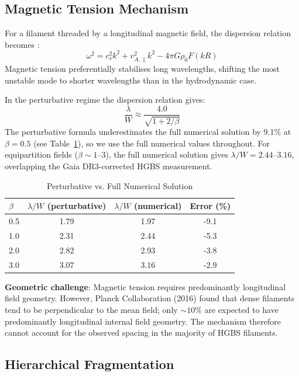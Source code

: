 \documentclass[twoside,twocolumn]{mnras}
\begin{document}
\subsection{Magnetic Tension Mechanism}

For a filament threaded by a longitudinal magnetic field, the dispersion relation
becomes \citep{Nakamura1993}:
\begin{equation}
\omega^2 = c_s^2 k^2 + v_{A,\parallel}^2 k^2 - 4\pi G\rho_0 F(kR)
\label{eq:dispersion}
\end{equation}
Magnetic tension preferentially stabilises long wavelengths, shifting the most unstable
mode to shorter wavelengths than in the hydrodynamic case.

In the perturbative regime the dispersion relation gives:
\begin{equation}
\frac{\lambda}{W} \approx \frac{4.0}{\sqrt{1 + 2/\beta}}
\label{eq:tension}
\end{equation}
The perturbative formula underestimates the full numerical solution by 9.1\% at $\beta=0.5$
(see Table~\ref{tab:perturbative}), so we use the full numerical values throughout.
For equipartition fields ($\beta \sim 1$--$3$), the full numerical solution gives
$\lambda/W = 2.44$--$3.16$, overlapping the Gaia DR3-corrected HGBS measurement.

\begin{table}
\caption{Perturbative vs. Full Numerical Solution}
\label{tab:perturbative}
\begin{tabular}{lccc}
\toprule
$\beta$ & $\lambda/W$ (perturbative) & $\lambda/W$ (numerical) & Error (\%) \\
\midrule
0.5 & 1.79 & 1.97 & -9.1 \\
1.0 & 2.31 & 2.44 & -5.3 \\
2.0 & 2.82 & 2.93 & -3.8 \\
3.0 & 3.07 & 3.16 & -2.9 \\
\bottomrule
\end{tabular}
\end{table}

\textbf{Geometric challenge}: Magnetic tension requires predominantly longitudinal field
geometry. However, Planck Collaboration (2016) found that dense filaments tend to be
perpendicular to the mean field; only ${\sim}10\%$ are expected to have predominantly
longitudinal internal field geometry. The mechanism therefore cannot account for the
observed spacing in the majority of HGBS filaments.

\subsection{Hierarchical Fragmentation}
\end{document}
